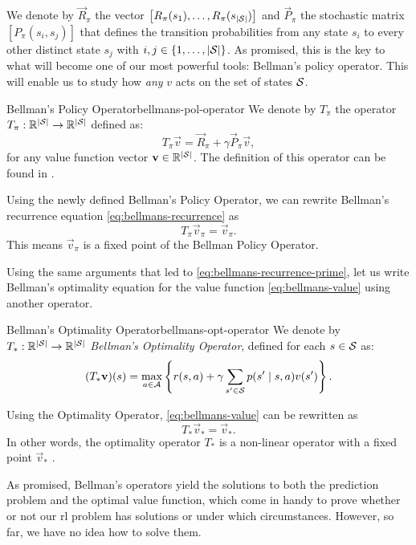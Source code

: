 We denote by $\vec{R}_\pi$ the vector $\left[ R_\pi(s_1), \dots, R_\pi
(s_{|\mathcal{S}|}) \right]$ and $\vec{P}_\pi$ the stochastic matrix $\left[
P_\pi(s_i, s_j) \right]$ that defines the transition probabilities from any
state $s_i$ to every other distinct state $s_j$ with $i, j \in \left\{ 1, \dots,
|\mathcal{S}| \right\}$. As promised, this is the key to what will become one of our
most powerful tools: Bellman's policy operator.  This will enable us to study
how \textit{any} $v$ acts on the set of states $\mathcal{S}$.

\begin{dfn}{Bellman's Policy Operator}{bellmans-pol-operator}
    We denote by $T_\pi$ the operator $T_\pi: \mathbb{R}^{|\mathcal{S}|} \to \mathbb{R}^{|\mathcal{S}|}$
    defined as:
    \[
        T_\pi \vec{v} = \vec{R}_\pi + \gamma \vec{P}_\pi \vec{v},
    \]
    for any value function vector $\mathbf{v} \in \mathbb{R}^{|\mathcal{S}|}$. The definition
    of this operator can be found in \cite[Ch.~5.4]{raoRL4F}.
\end{dfn}

Using the newly defined Bellman's Policy Operator, we can rewrite Bellman's
recurrence equation \eqref{eq:bellmans-recurrence} as
\[
    T_\pi \vec{v}_\pi = \vec{v}_\pi.
\]
This means $\vec{v}_\pi$ is a fixed point of the Bellman Policy Operator.

Using the same arguments that led to \eqref{eq:bellmans-recurrence-prime}, let
us write Bellman's optimality equation for the value function
\eqref{eq:bellmans-value} using another operator.

\begin{dfn}{Bellman's Optimality Operator}{bellmans-opt-operator}
    We denote by $T_*: \mathbb{R}^{|\mathcal{S}|} \to \mathbb{R}^{|\mathcal{S}|}$ \emph{Bellman's Optimality Operator}, defined for each $s \in \mathcal{S}$ as:
    \[
        (T_{*} \mathbf{v})(s) = \max_{a \in \mathcal{A}} \left\{ r(s, a) + \gamma \sum_{s' \in \mathcal{S}} p(s' \mid s, a) v(s') \right\}. 
    \]
\end{dfn}

Using the Optimality Operator, \eqref{eq:bellmans-value} can be rewritten as
\begin{equation}
    \label{eq:bellmans-optimality-operators}
    T_* \vec{v}_{*} = \vec{v}_{*}.
\end{equation}
In other words, the optimality operator $T_*$ is a non-linear operator with a
fixed point $\vec{v}_*$ \cite[Ch.~5.4]{raoRL4F}.

As promised, Bellman's operators yield the solutions to both the prediction
problem and the optimal value function, which come in handy to prove whether or
not our \ac{rl} problem has solutions or under which circumstances. However, so
far, we have no idea how to solve them.

